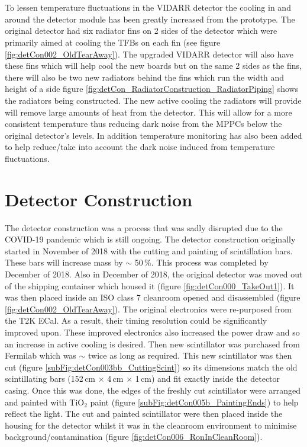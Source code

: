 \\\\To lessen temperature fluctuations in the VIDARR detector the cooling in and around the detector module has been greatly increased from the prototype. The original detector had six radiator fins on 2 sides of the detector which were primarily aimed at cooling the TFBs on each fin (see figure \ref{fig:detCon002_OldTearAway}). The upgraded VIDARR detector will also have these fins which will help cool the new boards but on the same 2 sides as the fins, there will also be two new radiators behind the fins which run the width and height of a side figure \ref{fig:detCon_RadiatorConstruction_RadiatorPiping} shows the radiators being constructed. The new active cooling the radiators will provide will remove large amounts of heat from the detector. This will allow for a more consistent temperature  thus reducing dark noise from the MPPCs below the original detector's levels. In addition temperature monitoring has also been added to help reduce/take into account the dark noise induced from temperature fluctuations. 

\section{Detector Construction}\label{sec:DetectorConstruction}
The detector construction was a process that was sadly disrupted due to the COVID-19 pandemic which is still ongoing. The detector construction originally started in November of 2018 with the cutting and painting of scintillation bars. These bars will increase mass by $\sim$ 50\,\%. This process was completed by December of 2018. Also in December of 2018, the original detector was moved out of the shipping container which housed it (figure \ref{fig:detCon000_TakeOut1}). It was then placed inside an ISO class 7 cleanroom opened and disassembled (figure \ref{fig:detCon002_OldTearAway}). The original electronics were re-purposed from the T2K ECal. As a result, their timing resolution could be significantly improved upon. These improved electronics also increased the power draw and so an increase in active cooling is desired. Then new scintillator was purchased from Fermilab which was $\sim$ twice as long as required. This new scintillator was then cut (figure \ref{subFig:detCon003bb_CuttingScint}) so its dimensions match the old scintillating bars (152\,cm $\times$ 4\,cm $\times$ 1\,cm) and fit exactly inside the detector casing. Once this was done, the edges of the freshly cut scintillator were arranged and painted with TiO$_2$ paint (figure \ref{subFig:detCon005b_PaintingEnds}) to help reflect the light. The cut and painted scintillator were then placed inside the housing for the detector  whilst it was in the cleanroom environment to minimise background/contamination (figure \ref{fig:detCon006_RonInCleanRoom}). 

